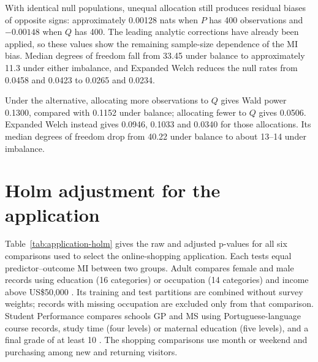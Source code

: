 With identical null populations, unequal allocation still produces
residual biases of opposite signs: approximately 0.00128 nats when
\(P\) has 400 observations and \(-0.00148\) when \(Q\) has 400.
The leading analytic corrections have already been applied, so these
values show the remaining sample-size dependence of the MI bias.
Median degrees of freedom fall from 33.45 under balance to approximately
11.3 under either imbalance, and Expanded Welch reduces the null rates
from 0.0458 and 0.0423 to 0.0265 and 0.0234.

Under the alternative, allocating more observations to \(Q\) gives Wald
power 0.1300, compared with 0.1152 under balance; allocating fewer to
\(Q\) gives 0.0506. Expanded Welch instead gives 0.0946, 0.1033 and
0.0340 for those allocations. Its median degrees of freedom drop from
40.22 under balance to about 13--14 under imbalance.

\section{Holm adjustment for the application}
\label{sec:application-holm}

Table~\ref{tab:application-holm} gives the raw and adjusted p-values for
all six comparisons used to select the online-shopping application.
Each tests equal predictor--outcome MI between two groups. Adult compares
female and male records using education (16 categories) or occupation
(14 categories) and income above US\$50,000 \citep{becker1996}. Its
training and test partitions are combined without survey weights;
records with missing occupation are excluded only from that comparison.
Student Performance compares schools GP and MS using Portuguese-language
course records, study time (four levels) or maternal education (five levels),
and a final grade of at least 10 \citep{cortez2008}. The shopping
comparisons use month or weekend and purchasing among new and returning visitors.


